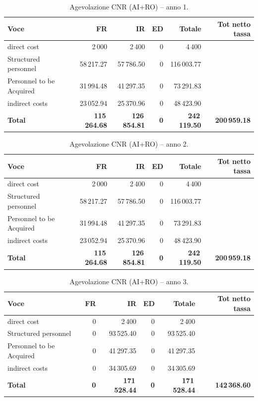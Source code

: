\documentclass{plan4ari_report}
\begin{document}
\begin{table}[H]\centering\footnotesize\caption{Agevolazione CNR (AI+RO) -- anno 1.}\label{tab:cnr-y1}
\begin{tabular}{lrrrrr}\toprule\textbf{Voce} & \textbf{FR} & \textbf{IR} & \textbf{ED} & \textbf{Totale} & \textbf{Tot netto tassa} \\\midrule
\quad direct cost & 2\,000 & 2\,400 & 0 & 4\,400 &  \\
\quad Structured personnel & 58\,217.27 & 57\,786.50 & 0 & 116\,003.77 &  \\
\quad Personnel to be Acquired & 31\,994.48 & 41\,297.35 & 0 & 73\,291.83 &  \\
\quad indirect costs & 23\,052.94 & 25\,370.96 & 0 & 48\,423.90 &  \\
\midrule\textbf{Total} & \textbf{115\,264.68} & \textbf{126\,854.81} & \textbf{0} & \textbf{242\,119.50} & \textbf{200\,959.18} \\
\bottomrule\end{tabular}\end{table}


\begin{table}[H]\centering\footnotesize\caption{Agevolazione CNR (AI+RO) -- anno 2.}\label{tab:cnr-y2}
\begin{tabular}{lrrrrr}\toprule\textbf{Voce} & \textbf{FR} & \textbf{IR} & \textbf{ED} & \textbf{Totale} & \textbf{Tot netto tassa} \\\midrule
\quad direct cost & 2\,000 & 2\,400 & 0 & 4\,400 &  \\
\quad Structured personnel & 58\,217.27 & 57\,786.50 & 0 & 116\,003.77 &  \\
\quad Personnel to be Acquired & 31\,994.48 & 41\,297.35 & 0 & 73\,291.83 &  \\
\quad indirect costs & 23\,052.94 & 25\,370.96 & 0 & 48\,423.90 &  \\
\midrule\textbf{Total} & \textbf{115\,264.68} & \textbf{126\,854.81} & \textbf{0} & \textbf{242\,119.50} & \textbf{200\,959.18} \\
\bottomrule\end{tabular}\end{table}


\begin{table}[H]\centering\footnotesize\caption{Agevolazione CNR (AI+RO) -- anno 3.}\label{tab:cnr-y3}
\begin{tabular}{lrrrrr}\toprule\textbf{Voce} & \textbf{FR} & \textbf{IR} & \textbf{ED} & \textbf{Totale} & \textbf{Tot netto tassa} \\\midrule
\quad direct cost & 0 & 2\,400 & 0 & 2\,400 &  \\
\quad Structured personnel & 0 & 93\,525.40 & 0 & 93\,525.40 &  \\
\quad Personnel to be Acquired & 0 & 41\,297.35 & 0 & 41\,297.35 &  \\
\quad indirect costs & 0 & 34\,305.69 & 0 & 34\,305.69 &  \\
\midrule\textbf{Total} & \textbf{0} & \textbf{171\,528.44} & \textbf{0} & \textbf{171\,528.44} & \textbf{142\,368.60} \\
\bottomrule\end{tabular}\end{table}
\end{document}

